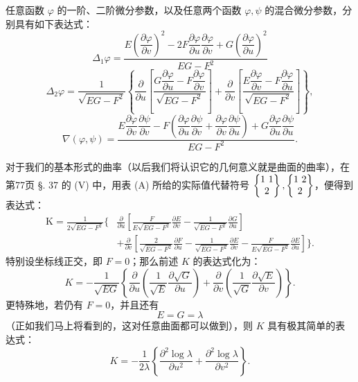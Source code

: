 任意函数 \(\varphi\) 的一阶、二阶微分参数，以及任意两个函数 \(\varphi,\psi\) 的混合微分参数，分别具有如下表达式：
\begin{equation}\tag{14}
\Delta_1\varphi=\frac{E\left(\dfrac{\partial\varphi}{\partial v}\right)^2-2F\dfrac{\partial\varphi}{\partial u}\dfrac{\partial\varphi}{\partial v}+G\left(\dfrac{\partial\varphi}{\partial u}\right)^2}{EG-F^2}
\end{equation}
\begin{equation}\tag{15}
\Delta_2\varphi=\frac{1}{\sqrt{EG-F^2}}\left\{
\frac{\partial}{\partial u}\left[\frac{G\dfrac{\partial\varphi}{\partial u}-F\dfrac{\partial\varphi}{\partial v}}{\sqrt{EG-F^2}}\right]
+
\frac{\partial}{\partial v}\left[\frac{E\dfrac{\partial\varphi}{\partial v}-F\dfrac{\partial\varphi}{\partial u}}{\sqrt{EG-F^2}}\right]
\right\},
\end{equation}
\begin{equation}\tag{16}
\nabla(\varphi,\psi)=\frac{E\dfrac{\partial\varphi}{\partial v}\dfrac{\partial\psi}{\partial v}-F\left(\dfrac{\partial\varphi}{\partial u}\dfrac{\partial\psi}{\partial v}+\dfrac{\partial\varphi}{\partial v}\dfrac{\partial\psi}{\partial u}\right)+G\dfrac{\partial\varphi}{\partial u}\dfrac{\partial\psi}{\partial u}}{EG-F^2}.
\end{equation}

对于我们的基本形式的曲率（以后我们将认识它的几何意义就是曲面的曲率），在第77页 \S. 37 的 (V) 中，用表 (A) 所给的实际值代替符号 \(\left\{\begin{matrix}1\ 1\\ 2\end{matrix}\right\}, \left\{\begin{matrix}1\ 2\\ 2\end{matrix}\right\}\)，便得到表达式：
\begin{equation}\tag{17}
\begin{aligned}
\mathrm K=\frac{1}{2\sqrt{EG-F^2}}\Bigg\{&
\frac{\partial}{\partial u}\left[\frac{F}{E\sqrt{EG-F^2}}\frac{\partial E}{\partial v}-\frac{1}{\sqrt{EG-F^2}}\frac{\partial G}{\partial u}\right]\\
&+\frac{\partial}{\partial v}\left[\frac{2}{\sqrt{EG-F^2}}\frac{\partial F}{\partial u}-\frac{1}{\sqrt{EG-F^2}}\frac{\partial E}{\partial v}-\frac{F}{E\sqrt{EG-F^2}}\frac{\partial E}{\partial u}\right]\Bigg\}.
\end{aligned}
\end{equation}
特别设坐标线正交，即 \(F=0\)；那么前述 \(K\) 的表达式化为：
\begin{equation}\tag{18}
 K=-\frac{1}{\sqrt{EG}}\left\{\frac{\partial}{\partial u}\left(\frac{1}{\sqrt E}\frac{\partial\sqrt G}{\partial u}\right)+
\frac{\partial}{\partial v}\left(\frac{1}{\sqrt G}\frac{\partial\sqrt E}{\partial v}\right)\right\}.
\end{equation}
更特殊地，若仍有 \(F=0\)，并且还有
\[
 E=G=\lambda
\]
（正如我们马上将看到的，这对任意曲面都可以做到），则 \(K\) 具有极其简单的表达式：
\begin{equation}\tag{19}
 K=-\frac{1}{2\lambda}\left\{\frac{\partial^2\log\lambda}{\partial u^2}+\frac{\partial^2\log\lambda}{\partial v^2}\right\}.
\end{equation}

